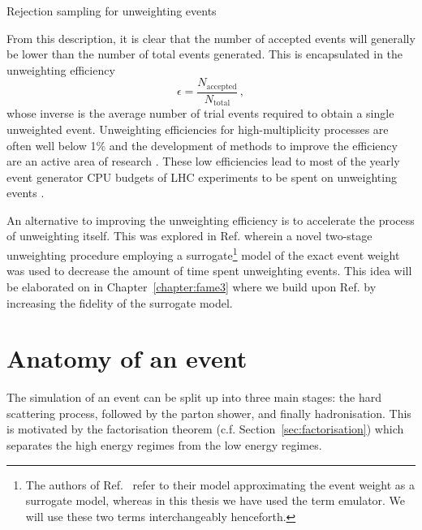 \documentclass[main.tex]{subfiles}
\begin{document}
    \begin{algorithm}[ht]
        \caption{Rejection sampling for unweighting events}\label{alg:unweighting}
    \end{algorithm}

    From this description, it is clear that the number
    of accepted events will generally be lower than
    the number of total events generated. This is encapsulated
    in the unweighting efficiency
    \begin{equation}\label{eqn:unweighting_efficiency}
        \epsilon = \dfrac{N_{\mathrm{accepted}}}{N_{\mathrm{total}}} \, ,
    \end{equation}
    whose inverse is the average number of trial
    events required to obtain a single unweighted event.
    Unweighting efficiencies for high-multiplicity processes
    are often well below 1\% \cite{Hoche:2019flt,Gao:2020zvv} and the development
    of methods to improve the efficiency are an active area of research
    \cite{Jadach:1999sf,Jadach:2002kn}.
    These low efficiencies lead to most of the
    yearly event generator CPU budgets of LHC experiments to be spent on
    unweighting events \cite{HSFPhysicsEventGeneratorWG:2020gxw}.

    An alternative to improving the unweighting efficiency
    is to accelerate the process of unweighting itself. This
    was explored in Ref. \cite{Danziger:2021eeg} wherein a
    novel two-stage unweighting procedure employing a surrogate\footnote{The authors of Ref.~\cite{Danziger:2021eeg}
    refer to their model approximating the event weight as a surrogate model, whereas in
    this thesis we have used the term emulator. We will use these two terms interchangeably
    henceforth.}
    model of the exact event weight was used to decrease the amount of
    time spent unweighting events. This idea will be elaborated on
    in Chapter~\ref{chapter:fame3} where we build upon
    Ref. \cite{Danziger:2021eeg} by increasing the fidelity of
    the surrogate model.

    \section{Anatomy of an event}\label{sec:anatomy_event}
    The simulation of an event can be split up into three
    main stages: the hard scattering process, followed by
    the parton shower, and finally hadronisation.
    This is motivated by the factorisation theorem (c.f. Section~\ref{sec:factorisation})
    which separates the high energy regimes from the low
    energy regimes.
\end{document}
